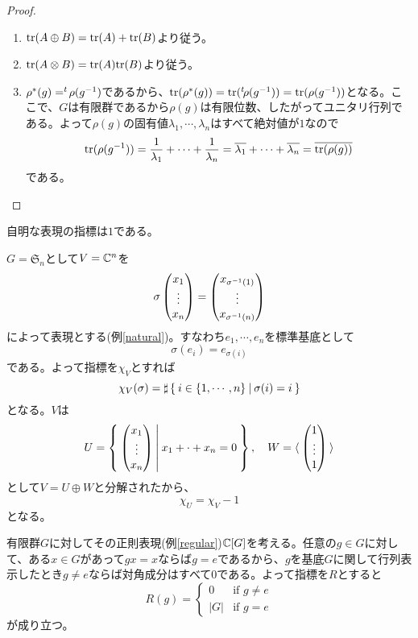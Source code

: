 \documentclass{ltjsreport}
\begin{document}
\begin{proof}
  \begin{enumerate}
    \item $\text{tr}(A\oplus B)=\text{tr}(A)+\text{tr}(B)$より従う。
    \item $\text{tr}(A\otimes B)=\text{tr}(A)\text{tr}(B)$より従う。
    \item $\rho^*(g)=^t\!\rho(g^{-1})$であるから、$\text{tr}(\rho^*(g))=\text{tr}(^t\!\rho(g^{-1}))=\text{tr}(\rho(g^{-1}))$となる。ここで、$G$は有限群であるから$\rho(g)$は有限位数、したがってユニタリ行列である。よって$\rho(g)$の固有値$\lambda_1,\cdots,\lambda_n$はすべて絶対値が$1$なので
    \[
    \text{tr}(\rho(g^{-1}))=\frac{1}{\lambda_1}+\cdots+\frac{1}{\lambda_n}=\overline{\lambda_1}+\cdots+\overline{\lambda_n}=\overline{\text{tr}(\rho(g))}
    \]
    である。
  \end{enumerate}
\end{proof}

\begin{eg}
  自明な表現の指標は$1$である。
\end{eg}

\begin{eg}\label{char_st_rep}
  $G=\mathfrak{S}_n$として$V=\mathbb{C}^n$を
  \[
  \sigma\begin{pmatrix} x_1\\\vdots\\x_n \end{pmatrix}=\begin{pmatrix} x_{\sigma^{-1}(1)}\\\vdots\\x_{\sigma^{-1}(n)} \end{pmatrix}  
  \]
  によって表現とする(例\ref{natural})。すなわち$e_1,\cdots,e_n$を標準基底として
  \[
  \sigma(e_i)=e_{\sigma(i)}
  \]
  である。よって指標を$\chi_V$とすれば
  \[
  \chi_V(\sigma)=\sharp\left\{\:i\in\{1,\cdots,n\}\:\middle|\:\sigma(i)=i\:\right\}  
  \]
  となる。$V$は
  \[
  U=\left\{\:\begin{pmatrix} x_1\\\vdots\\x_n \end{pmatrix}\:\middle|\:x_1+\cdot+x_n=0\:\right\},\quad W=\langle\:\begin{pmatrix} 1\\\vdots\\1 \end{pmatrix}\:\rangle  
  \]
  として$V=U\oplus W$と分解されたから、
  \[
  \chi_U=\chi_V-1  
  \]
  となる。
\end{eg}

\begin{eg}\label{char_reg_rep}
  有限群$G$に対してその正則表現(例\ref{regular})$\mathbb{C}[G]$を考える。任意の$g\in G$に対して、ある$x\in G$があって$gx=x$ならば$g=e$であるから、$g$を基底$G$に関して行列表示したとき$g\neq e$ならば対角成分はすべて0である。よって指標を$R$とすると
  \[
  R(g)=\left\{\begin{array}{cc}
    0 & \text{if }g\neq e\\
    |G| & \text{if }g=e
  \end{array}\right. 
  \]
  が成り立つ。
\end{eg}
\end{document}
